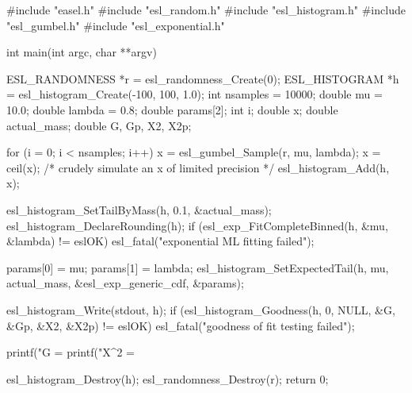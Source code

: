 \begin{cchunk}
#include "easel.h"
#include "esl_random.h"
#include "esl_histogram.h"
#include "esl_gumbel.h"
#include "esl_exponential.h"

int
main(int argc, char **argv)
{
  ESL_RANDOMNESS *r  = esl_randomness_Create(0);
  ESL_HISTOGRAM  *h  = esl_histogram_Create(-100, 100, 1.0);
  int     nsamples    = 10000;
  double  mu          = 10.0;
  double  lambda      = 0.8;
  double  params[2];
  int     i;
  double  x;
  double  actual_mass;
  double  G, Gp, X2, X2p;

  for (i = 0; i < nsamples; i++) {
    x = esl_gumbel_Sample(r, mu, lambda);
    x = ceil(x);      /* crudely simulate an x of limited precision */
    esl_histogram_Add(h, x);
  }

  esl_histogram_SetTailByMass(h, 0.1, &actual_mass);
  esl_histogram_DeclareRounding(h);
  if (esl_exp_FitCompleteBinned(h, &mu, &lambda) != eslOK)
    esl_fatal("exponential ML fitting failed");

  params[0] = mu;
  params[1] = lambda;
  esl_histogram_SetExpectedTail(h, mu, actual_mass, &esl_exp_generic_cdf, &params);

  esl_histogram_Write(stdout, h);
  if (esl_histogram_Goodness(h, 0, NULL, &G, &Gp, &X2, &X2p) != eslOK)
    esl_fatal("goodness of fit testing failed");

  printf("G   = %
  printf("X^2 = %

  esl_histogram_Destroy(h);
  esl_randomness_Destroy(r);
  return 0;
}
\end{cchunk}
